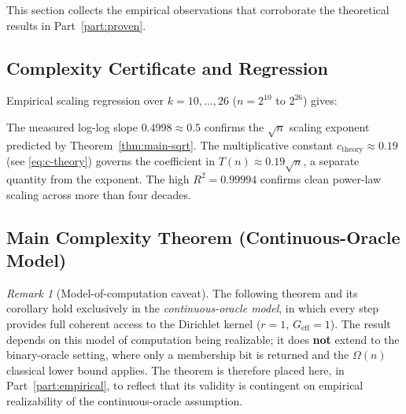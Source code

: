 \documentclass[12pt,a4paper]{article}
\theoremstyle{plain}
\theoremstyle{definition}
\theoremstyle{remark}
\newtheorem{remark}[theorem]{Remark}
\newcommand{\Geff}{G_{\mathrm{eff}}}
\begin{document}
This section collects the empirical observations that corroborate the
theoretical results in Part~\ref{part:proven}.

\subsection{Complexity Certificate and Regression}

Empirical scaling regression over $k=10,\ldots,26$ ($n=2^{10}$ to $2^{26}$)
gives:

\begin{center}
\end{center}

\noindent
The measured log-log slope $0.4998 \approx 0.5$ confirms the $\sqrt{n}$
scaling exponent predicted by Theorem~\ref{thm:main-sqrt}.  The multiplicative
constant $c_{\mathrm{theory}}\approx 0.19$ (see \eqref{eq:c-theory}) governs
the coefficient in $T(n)\approx 0.19\sqrt{n}$, a separate quantity from the
exponent.  The high $R^2=0.99994$ confirms clean power-law scaling across
more than four decades.

\subsection{Main Complexity Theorem (Continuous-Oracle Model)}

\begin{remark}[Model-of-computation caveat]
  The following theorem and its corollary hold exclusively in the
  \emph{continuous-oracle model}, in which every step provides full coherent
  access to the Dirichlet kernel ($r=1$, $\Geff=1$).  The result depends on
  this model of computation being realizable; it does \textbf{not} extend to
  the binary-oracle setting, where only a membership bit is returned and the
  $\Omega(n)$ classical lower bound applies.  The theorem is therefore placed
  here, in Part~\ref{part:empirical}, to reflect that its validity is
  contingent on empirical realizability of the continuous-oracle assumption.
\end{remark}
\end{document}
